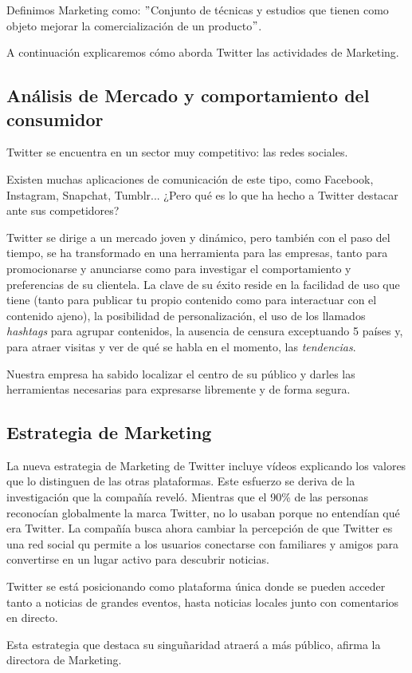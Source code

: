 Definimos Marketing como: $"$Conjunto de técnicas y estudios que tienen como objeto mejorar la comercialización de un producto$"$.

A continuación explicaremos cómo aborda Twitter las actividades de Marketing.

\subsection{Análisis de Mercado y comportamiento del consumidor}

Twitter se encuentra en un sector muy competitivo: las redes sociales.

Existen muchas aplicaciones de comunicación de este tipo, como Facebook, Instagram, Snapchat, Tumblr... ¿Pero qué es lo que ha hecho a Twitter destacar ante sus competidores?

Twitter se dirige a un mercado joven y dinámico, pero también con el paso del tiempo, se ha transformado en una herramienta para las empresas, tanto para promocionarse y anunciarse como para investigar el comportamiento y preferencias de su clientela.
La clave de su éxito reside en la facilidad de uso que tiene (tanto para publicar tu propio contenido como para interactuar con el contenido ajeno), la posibilidad de personalización, el uso de los llamados \textit{hashtags} para agrupar contenidos, la ausencia de censura exceptuando 5 países y, para atraer visitas y ver de qué se habla en el momento, las \textit{tendencias}.

Nuestra empresa ha sabido localizar el centro de su público y darles las herramientas necesarias para expresarse libremente y de forma segura.

\subsection{Estrategia de Marketing}

La nueva estrategia de Marketing de Twitter incluye vídeos explicando los valores que lo distinguen de las otras plataformas. Este esfuerzo se deriva de la investigación que la compañía reveló. Mientras que el 90\% de las personas reconocían globalmente la marca Twitter, no lo usaban porque no entendían qué era Twitter. La compañía busca ahora cambiar la percepción de que Twitter es una red social qu permite a los usuarios conectarse con familiares y amigos para convertirse en un lugar activo para descubrir noticias.

Twitter se está posicionando como plataforma única donde se pueden acceder tanto a noticias de grandes eventos, hasta noticias locales junto con comentarios en directo.

Esta estrategia que destaca su singuñaridad atraerá a más público, afirma la directora de Marketing.